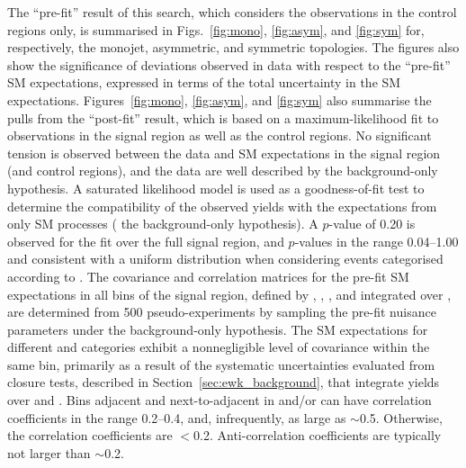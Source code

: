 The ``pre-fit'' result of this search, which considers the
observations in the control regions only, is summarised in
Figs.~\ref{fig:mono}, \ref{fig:asym}, and \ref{fig:sym} for,
respectively, the monojet, asymmetric, and symmetric topologies. 
The figures also show the significance of deviations observed in data
with respect to the ``pre-fit'' SM expectations, expressed in terms of
the total uncertainty in the SM expectations. Figures~\ref{fig:mono},
\ref{fig:asym}, and \ref{fig:sym} also summarise the pulls from the
``post-fit'' result, which is based on a maximum-likelihood fit to
observations in the signal region as well as the control regions. No
significant tension is observed between the data and SM expectations
in the signal region (and control regions), and the data are well
described by the background-only hypothesis. A saturated likelihood
model %
is used as a goodness-of-fit test to determine the compatibility of
the observed yields with the expectations from only SM processes (\ie
the background-only hypothesis). A $p$-value of 0.20 is observed for
the fit over the full signal region, and $p$-values in the range
0.04--1.00 and consistent with a uniform distribution when considering
events categorised according to \njet.
The covariance and correlation matrices for the pre-fit SM
expectations in all bins of the signal region, defined by \njet, \nb,
\scalht, and integrated over \HTmiss, are determined from 500
pseudo-experiments by sampling the pre-fit nuisance parameters under
the background-only hypothesis. The SM expectations for different
\njet and \nb categories exhibit a nonnegligible level of covariance
within the same \scalht bin, primarily as a result of the systematic
uncertainties evaluated from closure tests, described in
Section~\ref{sec:ewk_background}, that integrate yields over \njet and
\nb. Bins adjacent and next-to-adjacent in \njet and/or \nb can have
correlation coefficients in the range 0.2--0.4, and, infrequently, as
large as $\sim$0.5. Otherwise, the correlation coefficients are
$<$0.2. Anti-correlation coefficients are typically not larger than
$\sim$0.2.

%
%
%

